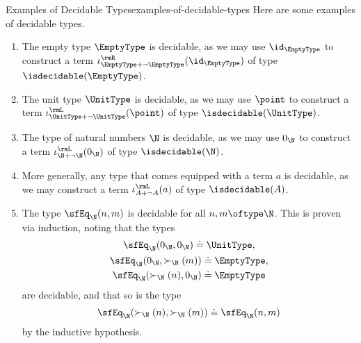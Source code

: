 \begin{example}{Examples of Decidable Types}{examples-of-decidable-types}%
    Here are some examples of decidable types.
    \begin{enumerate}
        \item\label{examples-of-decidable-types-the-empty-type}The empty type $\EmptyType$ is decidable, as we may use $\id_{\EmptyType}$ to construct a term $\iota^{\rmR}_{\EmptyType+\neg\EmptyType}(\id_{\EmptyType})$ of type $\isdecidable(\EmptyType)$.
        \item\label{examples-of-decidable-types-the-unit-type}The unit type $\UnitType$ is decidable, as we may use $\point$ to construct a term $\iota^{\rmL}_{\UnitType+\neg\UnitType}(\point)$ of type $\isdecidable(\UnitType)$.
        \item\label{examples-of-decidable-types-the-natural-numbers}The type of natural numbers $\N$ is decidable, as we may use $0_{\N}$ to construct a term $\iota^{\rmL}_{\N+\neg\N}(0_{\N})$ of type $\isdecidable(\N)$.
        \item\label{examples-of-decidable-types-types-equipped-with-terms}More generally, any type that comes equipped with a term $a$ is decidable, as we may construct a term $\iota^{\rmL}_{A+\neg A}(a)$ of type $\isdecidable(A)$.
        \item\label{examples-of-decidable-types-observational-equality-on-natural-numbers}The type $\sfEq_{\N}(n,m)$ is decidable for all $n,m\oftype\N$. This is proven via induction, noting that the types
            \begin{gather*}
                \sfEq_{\N}(0_{\N},0_{\N})\doteq\UnitType,\\%
                \begin{aligned}
                    \sfEq_{\N}(0_{\N},\succ_{\N}(m)) &\doteq \EmptyType,\\
                    \sfEq_{\N}(\succ_{\N}(n),0_{\N}) &\doteq \EmptyType
                \end{aligned}
            \end{gather*}
            are decidable, and that so is the type
            \[
                \sfEq_{\N}(\succ_{\N}(n),\succ_{\N}(m))%
                \doteq%
                \sfEq_{\N}(n,m)%
            \]%
            by the inductive hypothesis.
    \end{enumerate}
\end{example}

